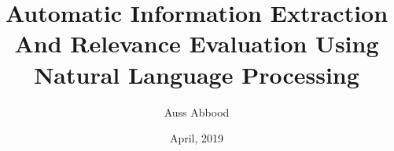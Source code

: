 
\title{Automatic Information Extraction And Relevance Evaluation Using Natural Language Processing}

\author{Auss Abbood}





\date{April, 2019}

